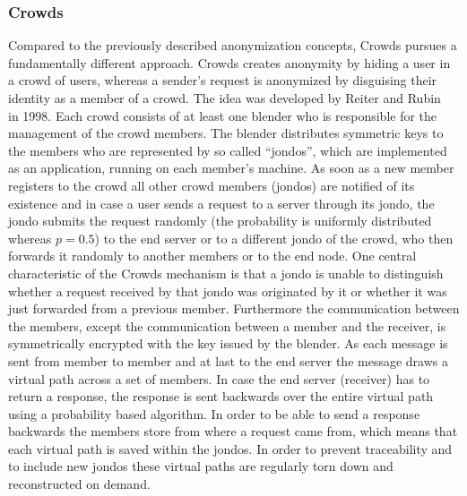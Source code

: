\documentclass{sig-alternate}
\begin{document}
\subsubsection {Crowds}
Compared to the previously described anonymization concepts, Crowds pursues a fundamentally different approach. Crowds creates anonymity by hiding a user in a crowd of users, whereas a sender's request is anonymized by disguising their identity as a member of a crowd. The idea was developed by Reiter and Rubin~\cite{reiter1998crowds} in 1998. Each crowd consists of at least one blender who is responsible for the management of the crowd members. The blender distributes symmetric keys to the members who are represented by so called ``jondos'', which are implemented as an application, running on each member's machine. As soon as a new member registers to the crowd all other crowd members (jondos) are notified of its existence and in case a user sends a request to a server through its jondo, the jondo submits the request randomly (the probability is uniformly distributed whereas $p = 0.5$) to the end server or to a different jondo of the crowd, who then forwards it randomly to another members or to the end node. One central characteristic of the Crowds mechanism is that a jondo is unable to distinguish whether a request received by that jondo was originated by it or whether it was just forwarded from a previous member. Furthermore the communication between the members, except the communication between a member and the receiver, is symmetrically encrypted with the key issued by the blender. As each message is sent from member to member and at last to the end server the message draws a virtual path across a set of members. In case the end server (receiver) has to return a response, the response is sent backwards over the entire virtual path using a probability based algorithm. In order to be able to send a response backwards the members store from where a request came from, which means that each virtual path is saved within the jondos. In order to prevent traceability and to include new jondos these virtual paths are regularly torn down and reconstructed on demand. 
\end{document}
